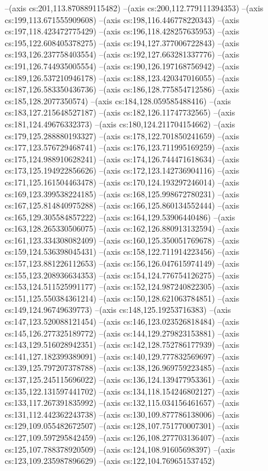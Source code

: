 --(axis cs:201,113.870889115482)
--(axis cs:200,112.779111394353)
--(axis cs:199,113.671555909608)
--(axis cs:198,116.446778220343)
--(axis cs:197,118.423472775429)
--(axis cs:196,118.428257635953)
--(axis cs:195,122.608405378275)
--(axis cs:194,127.377006722843)
--(axis cs:193,126.237758403554)
--(axis cs:192,127.663281337776)
--(axis cs:191,126.744935005554)
--(axis cs:190,126.197168756942)
--(axis cs:189,126.537210946178)
--(axis cs:188,123.420347016055)
--(axis cs:187,126.583350436736)
--(axis cs:186,128.775854712586)
--(axis cs:185,128.2077350574)
--(axis cs:184,128.059585488416)
--(axis cs:183,127.215648527187)
--(axis cs:182,126.11747732565)
--(axis cs:181,124.49676332373)
--(axis cs:180,124.211704154662)
--(axis cs:179,125.288880193327)
--(axis cs:178,122.701850241659)
--(axis cs:177,123.576729468741)
--(axis cs:176,123.711995169259)
--(axis cs:175,124.988910628241)
--(axis cs:174,126.744471618634)
--(axis cs:173,125.194922856626)
--(axis cs:172,123.142736904116)
--(axis cs:171,125.161504463478)
--(axis cs:170,124.193297246014)
--(axis cs:169,123.399538224185)
--(axis cs:168,125.998672780231)
--(axis cs:167,125.814840975288)
--(axis cs:166,125.860134552444)
--(axis cs:165,129.305584857222)
--(axis cs:164,129.53906440486)
--(axis cs:163,128.265330506075)
--(axis cs:162,126.880913132594)
--(axis cs:161,123.334308082409)
--(axis cs:160,125.350051769678)
--(axis cs:159,124.536398045431)
--(axis cs:158,122.711914223456)
--(axis cs:157,123.881226112653)
--(axis cs:156,126.047615974149)
--(axis cs:155,123.208936634353)
--(axis cs:154,124.776754126275)
--(axis cs:153,124.511525991177)
--(axis cs:152,124.987240822305)
--(axis cs:151,125.550384361214)
--(axis cs:150,128.621063784851)
--(axis cs:149,124.96749639773)
--(axis cs:148,125.19253716383)
--(axis cs:147,123.520088121454)
--(axis cs:146,123.023526818484)
--(axis cs:145,126.277325189772)
--(axis cs:144,129.279823153881)
--(axis cs:143,129.516028942351)
--(axis cs:142,128.752786177939)
--(axis cs:141,127.182399389091)
--(axis cs:140,129.777832569697)
--(axis cs:139,125.797207378788)
--(axis cs:138,126.969759223485)
--(axis cs:137,125.245115696022)
--(axis cs:136,124.139477953361)
--(axis cs:135,122.131597441702)
--(axis cs:134,118.154246802127)
--(axis cs:133,117.267391835992)
--(axis cs:132,115.034156461657)
--(axis cs:131,112.442362243738)
--(axis cs:130,109.877786138006)
--(axis cs:129,109.055482672507)
--(axis cs:128,107.751770007301)
--(axis cs:127,109.597295842459)
--(axis cs:126,108.277703136407)
--(axis cs:125,107.788378920509)
--(axis cs:124,108.91605698397)
--(axis cs:123,109.235987896629)
--(axis cs:122,104.769651537452)
